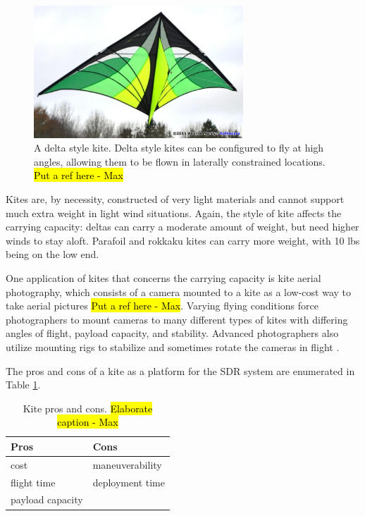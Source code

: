 \begin{figure}[ht]
\centering
\includegraphics[width=0.70\textwidth]{img/delta-kite.jpg}
\caption{A delta style kite. Delta style kites can be configured to fly at high angles, allowing them to be flown in laterally constrained locations. \hl{Put a ref here - Max}}
\label{fig:delta_kite}
\end{figure}\par
Kites are, by necessity, constructed of very light materials and cannot support much extra weight in light wind situations. Again, the style of kite affects the carrying capacity: deltas can carry a moderate amount of weight, but need higher winds to stay aloft. Parafoil and rokkaku kites can carry more weight, with 10 lbs being on the low end.\par
One application of kites that concerns the carrying capacity is kite aerial photography, which consists of a camera mounted to a kite as a low-cost way to take aerial pictures \hl{Put a ref here - Max}. Varying flying conditions force photographers to mount cameras to many different types of kites with differing angles of flight, payload capacity, and stability. Advanced photographers also utilize mounting rigs to stabilize and sometimes rotate the cameras in flight \cite{kite_iqp}.\par
The pros and cons of a kite as a platform for the SDR system are enumerated in Table \ref{table:kite_pc}.
\begin{table}[ht]
\centering
\caption{Kite pros and cons. \hl{Elaborate caption - Max}}
\label{table:kite_pc}
\begin{tabular}{l|l}
  Pros & Cons \\ \hline
  cost & maneuverability \\
  flight time & deployment time \\
  payload capacity & \\
\end{tabular}
\end{table}\par

